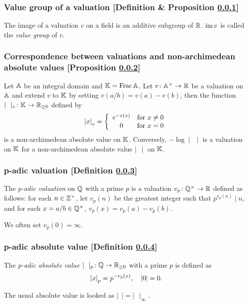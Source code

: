 \subsubsection{Value group of a valuation [Definition \& Proposition \ref{value-group-of-a-valuation}]}\label{value-group-of-a-valuation}
The image of a valuation $v$ on a field is an additive subgroup of $\mathbb{R}$. $\mathrm{im}\, v$ is called the \textit{value group} of $v$.

\subsubsection{Correspondence between valuations and non-archimedean absolute values [Proposition \ref{correspondence-between-valuations-and-non-archimedean-absolute-values}]}\label{correspondence-between-valuations-and-non-archimedean-absolute-values}
Let $\mathbb{A}$ be an integral domain and $\mathbb{K} = \mathrm{Frac} \,\mathbb{A}$. Let $v\colon \mathbb{A}^\times \to \mathbb{R}$ be a valuation on $\mathbb{A}$ and extend $v$ to $\mathbb{K}$ by setting $v(a/b) = v(a) - v(b)$, then the function $\mid\ \ \mid_v \colon \mathbb{K} \to \mathbb{R}_{\ge 0}$ defined by
\[
\left| x \right|_v = \left\{ \begin{array}{cl}
 e^{-v(x)} & \text{for}\ x \neq 0 \\
 0 & \text{for}\ x = 0
 \end{array} \right.
 \] is a non-archimedean absolute value on $\mathbb{K}$. Conversely, $-\log \mid \,\ \mid$ is a valuation on $\mathbb{K}$ for a non-archimedean absolute value $\mid\ \ \mid$ on $\mathbb{K}$.


\subsubsection{p-adic valuation [Definition \ref{p-adic-valuation}]}\label{p-adic-valuation}
The \textit{p-adic valuation} on $\mathbb{Q}$ with a prime $p$ is a valuation $v_p \colon \mathbb{Q}^\times \to \mathbb{R}$ defined as follows: for each $n \in \mathbb{Z}^\times$, let $v_p(n)$ be the greatest integer such that $p^{v_p(n)} \mid n$, and for each $x = a / b \in \mathbb{Q}^\times$, $v_p(x) = v_p(a) - v_p(b)$.

We often set $v_p(0) = \infty$.

\subsubsection{p-adic absolute value [Definition \ref{p-adic-absolute-value}]}\label{p-adic-absolute-value}
The \textit{p-adic absolute value} $\mid\ \ \mid_p \colon \bb{Q} \to \bb{R}_{\ge0}$ with a prime $p$ is defined as
\[
\left| x \right|_p = p^{-v_p(x)},\quad |0| = 0.
\]

The usual absolute value is looked as $\mid\ \ \mid = \mid\ \ \mid_\infty$.
